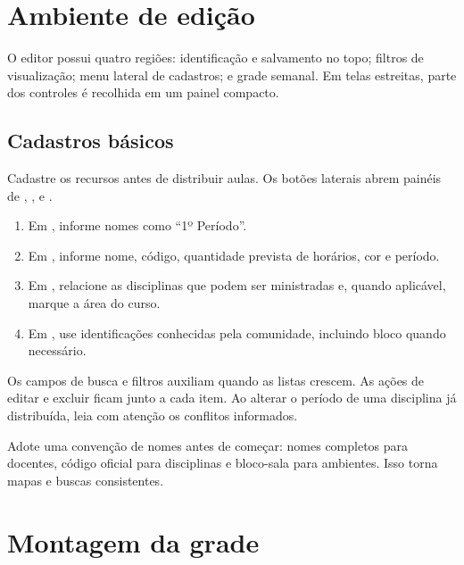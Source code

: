 \chapter{Ambiente de edição}

O editor possui quatro regiões: identificação e salvamento no topo; filtros de visualização; menu lateral de cadastros; e grade semanal. Em telas estreitas, parte dos controles é recolhida em um painel compacto.


\section{Cadastros básicos}

Cadastre os recursos antes de distribuir aulas. Os botões laterais abrem painéis de , ,  e .

\begin{enumerate}
  \item Em , informe nomes como ``1º Período''.
  \item Em , informe nome, código, quantidade prevista de horários, cor e período.
  \item Em , relacione as disciplinas que podem ser ministradas e, quando aplicável, marque a área do curso.
  \item Em , use identificações conhecidas pela comunidade, incluindo bloco quando necessário.
\end{enumerate}

Os campos de busca e filtros auxiliam quando as listas crescem. As ações de editar e excluir ficam junto a cada item. Ao alterar o período de uma disciplina já distribuída, leia com atenção os conflitos informados.


\begin{tipbox}
Adote uma convenção de nomes antes de começar: nomes completos para docentes, código oficial para disciplinas e bloco-sala para ambientes. Isso torna mapas e buscas consistentes.
\end{tipbox}

\chapter{Montagem da grade}

